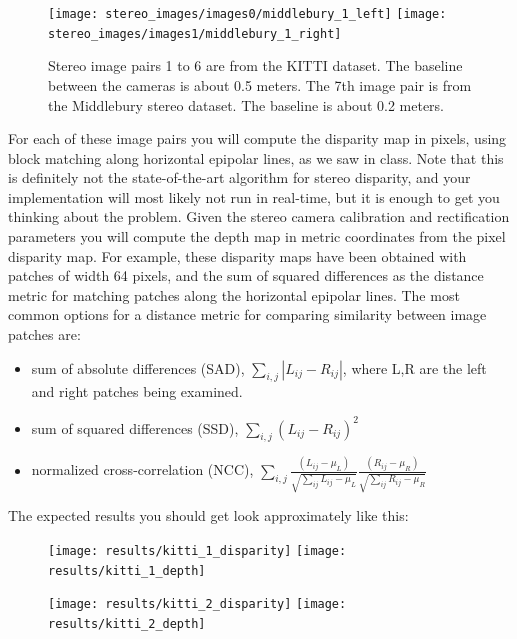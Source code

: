 \documentclass[11pt, a4paper]{article}
\begin{document}
    
\begin{figure}[h!]
  \begin{center}    
    \texttt{[image: stereo\_images/images0/middlebury\_1\_left]}
    \texttt{[image: stereo\_images/images1/middlebury\_1\_right]}
  \end{center} 
  \caption{Stereo image pairs 1 to 6 are from the KITTI dataset. The baseline between the cameras is about 0.5 meters. The 7th image pair is from the Middlebury stereo dataset. The baseline is about 0.2 meters.}
  \label{fig:kitti_stereo}
\end{figure}
\noindent For each of these image pairs you will compute the disparity map in pixels, using block matching along horizontal epipolar lines, as we saw in class. Note that this is definitely not the state-of-the-art
algorithm for stereo disparity, and your implementation will most likely not run in real-time, but it is enough to get you thinking about the problem. 
\newline
\newline
\noindent Given the stereo camera calibration and rectification parameters 
you will compute the depth map in metric coordinates from the pixel disparity map. For example, these disparity maps have been obtained with patches of width 64 pixels, and the sum of squared differences as the distance 
metric for matching patches along the horizontal epipolar lines. The most common options for a distance metric for comparing similarity between image patches are:
\begin{itemize}
 \item sum of absolute differences (SAD), $\sum_{i,j}|L_{ij} - R_{ij}|$, where L,R are the left and right patches being examined.
 \item sum of squared differences (SSD), $\sum_{i,j}(L_{ij} - R_{ij})^2$
 \item normalized cross-correlation (NCC), $\sum_{i,j} \frac{(L_{ij} - \mu_L)}{\sqrt{\sum_{ij}{L_{ij} - \mu_L}}} \frac{(R_{ij} - \mu_R)}{\sqrt{\sum_{ij}{R_{ij} - \mu_R}}}$
\end{itemize}
\noindent The expected results you should get look approximately like this: 
\begin{figure}[h!]
  \begin{center}
    \texttt{[image: results/kitti\_1\_disparity]}
    \texttt{[image: results/kitti\_1\_depth]}
  \end{center}
\end{figure}
    
\begin{figure}[h!]
  \begin{center}
    \texttt{[image: results/kitti\_2\_disparity]}
    \texttt{[image: results/kitti\_2\_depth]}
  \end{center}
\end{figure}
\end{document}
